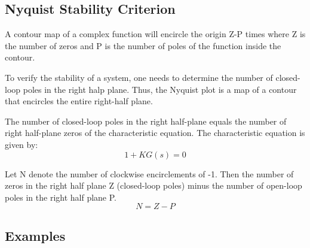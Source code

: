 \subsection{Nyquist Stability Criterion}

A contour map of a complex function will encircle the origin Z-P times where Z is the number
of zeros and P is the number of poles of the function inside the contour.

To verify the stability of a system, one needs to determine the number of closed-loop poles
in the right halp plane. Thus, the Nyquist plot is a map of a contour that encircles
the entire right-half plane.

The number of closed-loop poles in the right half-plane equals the number of right half-plane
zeros of the characteristic equation. The characteristic equation is given by:
$$1+KG(s) = 0$$

Let N denote the number of clockwise encirclements of -1. Then the number of zeros in
the right half plane Z (closed-loop poles) minus the number of open-loop poles in the right half plane P.
$$N = Z-P$$

\subsection{Examples}
